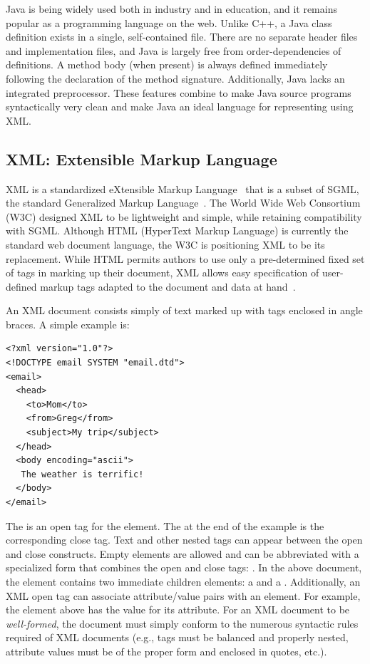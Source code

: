 \documentclass{article}
\begin{document}

Java is being widely used both in industry and in education, and it
remains popular as a programming language on the web.  Unlike C++, a
Java class definition exists in a single, self-contained file.  There
are no separate header files and implementation files, and Java is
largely free from order-dependencies of definitions.  A method body
(when present) is always defined immediately following the declaration
of the method signature.  Additionally, Java lacks an integrated
preprocessor.  These features combine to make Java source programs
syntactically very clean and make Java an ideal language for
representing using XML.

\subsection{XML: Extensible Markup Language}

XML is a standardized eXtensible Markup Language~\cite{XML} that is a
subset of SGML, the standard Generalized Markup Language~\cite{SGML}.
The World Wide Web Consortium (W3C) designed XML to be lightweight and
simple, while retaining compatibility with SGML.  Although HTML
(HyperText Markup Language) is currently the standard web document
language, the W3C is positioning XML to be its replacement.  While HTML
permits authors to use only a pre-determined fixed set of tags in
marking up their document, XML allows easy specification of user-defined
markup tags adapted to the document and data at
hand~\cite{LaTeXWeb,XML-Handbook}.

An XML document consists simply of text marked up with tags enclosed in
angle braces.  A simple example is:

\begin{verbatim}
<?xml version="1.0"?>
<!DOCTYPE email SYSTEM "email.dtd">
<email>
  <head>
    <to>Mom</to>
    <from>Greg</from>
    <subject>My trip</subject>
  </head>
  <body encoding="ascii">
   The weather is terrific!
  </body>
</email>
\end{verbatim}

The  is an open tag for the  element.
The  at the end of the example is the corresponding
close tag.  Text and other nested tags can appear between the open and
close constructs. Empty elements are allowed and can be abbreviated with
a specialized form that combines the open and close tags:
.  In the above document, the
 element contains two immediate children elements: a
 and a .  Additionally, an XML open tag
can associate attribute/value pairs with an element.  For example, the
 element above has the value  for its
 attribute.  For an XML document to be
\emph{well-formed}, the document must simply conform to the numerous
syntactic rules required of XML documents (e.g., tags must be balanced
and properly nested, attribute values must be of the proper form and
enclosed in quotes, etc.).
\end{document}
